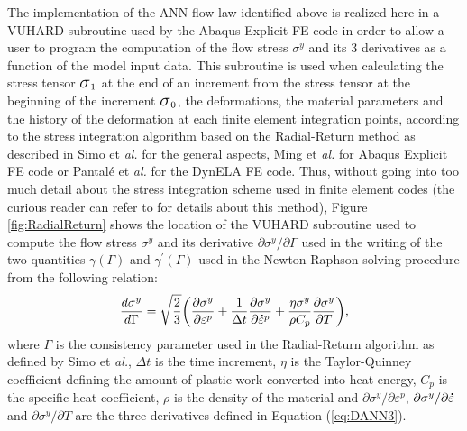 \documentclass[algorithms,article,submit,pdftex,moreauthors]{Definitions/mdpi}
\makeatletter
\DeclareRobustCommand{\Sig}{\mbox{\Large\ensuremath{\sigma}}}
\DeclareRobustCommand{\mdot}[1]{\accentset{\mbox{\bfseries .}}{#1}}
\DeclareRobustCommand{\eal}{et \emph{al.}\@\xspace}
\makeatother
\begin{document}
The implementation of the ANN flow law identified above is realized here in a VUHARD subroutine used by the Abaqus Explicit FE code in order to allow a user to program the computation of the flow stress $\sigma^y$ and its 3 derivatives as a function of the model input data.
This subroutine is used when calculating the stress tensor $\Sig_1$ at the end of an increment from the stress tensor at the beginning of the increment $\Sig_0$, the deformations, the material parameters and the history of the deformation at each finite element integration points, according to the stress integration algorithm based on the Radial-Return method as described in Simo \eal \cite{Simo-1998} for the general aspects, Ming \eal \cite{Ming-2018} for Abaqus Explicit FE code or Pantalé \eal \cite{Pantale-2004} for the DynELA FE code.
Thus, without going into too much detail about the stress integration scheme used in finite element codes (the curious reader can refer to \cite{Ponthot-2002, Ming-2018, Pantale-2004, Liang-2022} for details about this method), Figure \ref{fig:RadialReturn} shows the location of the VUHARD subroutine used to compute the flow stress $\sigma^y$ and its derivative $\partial\sigma^y/\partial\Gamma$ used in the writing of the two quantities $\gamma(\Gamma)$ and $\gamma^{'}(\Gamma)$ used in the Newton-Raphson solving procedure from the following relation:
\begin{equation}
\frac{d\sigma^{y}}{d\Gamma} = \sqrt{\frac{2}{3}}\left(\frac{\partial\sigma^{y}}{\partial\varepsilon^{p}}+\frac{1}{\Delta t}\frac{\partial\sigma^{y}}{\partial\mdot{\varepsilon}^p}+\frac{\eta\sigma^{y}}{\rho C_{p}}\frac{\partial\sigma^{y}}{\partial T}\right)\label{eq:derivatives},
\end{equation}
where $\Gamma$ is the consistency parameter used in the Radial-Return algorithm as defined by Simo \eal \cite{Simo-1998}, $\Delta t$ is the time increment, $\eta$ is the Taylor-Quinney coefficient defining the amount of plastic work converted into heat energy, $C_{p}$ is the specific heat coefficient, $\rho$ is the density of the material and $\partial \sigma^y/\partial\varepsilon^p$, $\partial \sigma^y/\partial\mdot\varepsilon$ and $\partial \sigma^y/\partial T$ are the three derivatives defined in Equation (\ref{eq:DANN3}).
\end{document}
